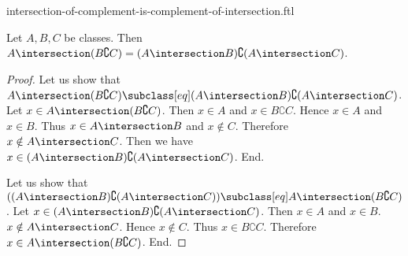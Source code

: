 \documentclass{article}
\begin{document}
\begin{smodule}[creators={Marcel Schütz}]{intersection-of-complement-is-complement-of-intersection.ftl}

  \begin{fproposition*}[label=5672367154003968]
    Let $A, B, C$ be classes.
    Then $A \intersection (B \complement C) = (A \intersection B) \complement (A \intersection C)$.
  \end{fproposition*}
  \begin{proof}
    Let us show that $A \intersection (B \complement C) \subclass[eq]
    (A \intersection B) \complement (A \intersection C)$.
      Let $x \in A \intersection (B \complement C)$.
      Then $x \in A$ and $x \in B \complement C$.
      Hence $x \in A$ and $x \in B$.
      Thus $x \in A \intersection B$ and $x \notin C$.
      Therefore $x \notin A \intersection C$.
      Then we have $x \in (A \intersection B) \complement (A \intersection C)$.
    End.

    Let us show that $((A \intersection B) \complement (A \intersection C)) \subclass[eq]
    A \intersection (B \complement C)$. %
      Let $x \in (A \intersection B) \complement (A \intersection C)$.
      Then $x \in A$ and $x \in B$.
      $x \notin A \intersection C$.
      Hence $x \notin C$.
      Thus $x \in B \complement C$.
      Therefore $x \in A \intersection (B \complement C)$.
    End.
  \end{proof}
\end{smodule}
\end{document}
